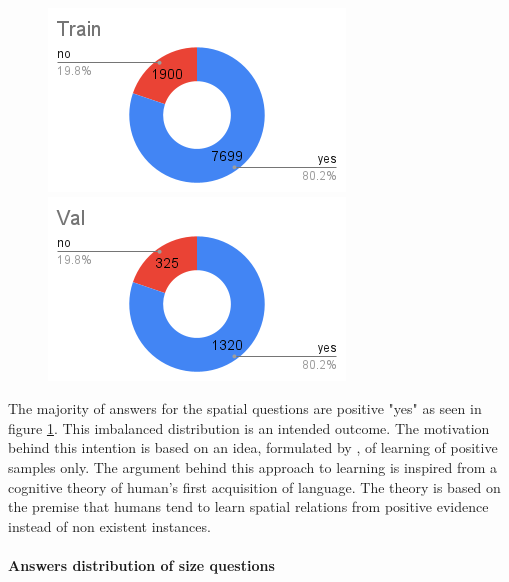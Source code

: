 \begin{figure}[H]
\includegraphics[scale=0.45]{latex/images/TrAnSp.png}
\includegraphics[scale=0.45]{latex/images/VlAnSp.png}
\label{fig:AnsDist}
\caption{}
\end{figure}

The majority of answers for the spatial questions are positive "yes" as seen in figure \ref{fig:AnsDist}. This imbalanced distribution is an intended outcome. The motivation behind this intention is based on an idea, formulated by \cite{regier1996human}, of learning of positive samples only. The argument behind this approach to learning  is inspired from a cognitive theory of human's first acquisition of language. The theory is  based on the premise that humans tend to learn spatial relations from positive evidence instead of non existent instances.

\paragraph{Answers distribution of size questions}

